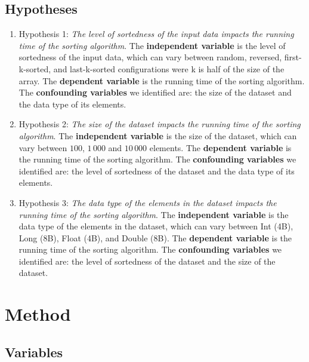 \documentclass[unicode,11pt,a4paper,oneside,numbers=endperiod,openany]{scrartcl}
\begin{document}
    \subsection{Hypotheses}

    \begin{enumerate}
        \item Hypothesis 1: \textit{ The level of sortedness of the input data impacts the running time of the sorting algorithm}. The \textbf{independent variable} is the level of sortedness of the input data, which can vary between random, reversed, first-k-sorted, and last-k-sorted configurations were k is half of the size of the array. The \textbf{dependent variable} is the running time of the sorting algorithm. The \textbf{confounding variables} we identified are: the size of the dataset and the data type of its elements. 

        \item Hypothesis 2: \textit{The size of the dataset impacts the running time of the sorting algorithm}. The \textbf{independent variable} is the size of the dataset, which can vary between $100$, $1\,000$ and $10\,000$ elements. The \textbf{dependent variable} is the running time of the sorting algorithm. The \textbf{confounding variables} we identified are: the level of sortedness of the dataset and the data type of its elements. 

        \item Hypothesis 3: \textit{The data type of the elements in the dataset impacts the running time of the sorting algorithm}. The \textbf{independent variable} is the data type of the elements in the dataset, which can vary between Int (4B), Long (8B), Float (4B), and Double (8B). The \textbf{dependent variable} is the running time of the sorting algorithm. The \textbf{confounding variables} we identified are: the level of sortedness of the dataset and the size of the dataset.

    \end{enumerate}

\section{Method}

    \subsection{Variables}
\end{document}
